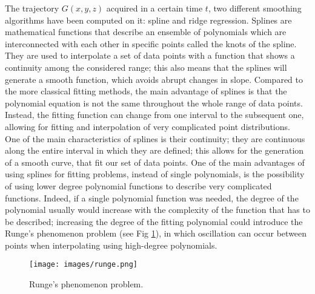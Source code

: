 
\noindent The trajectory $G(x, y, z)$ acquired in a certain time $t$, two different smoothing algorithms have been computed on it: spline and ridge regression.
Splines are mathematical functions that describe an ensemble of polynomials which are interconnected with each other in specific points called the knots of the spline. They are used to interpolate a set of data points with a function that shows a continuity among the considered range; this also means that the splines will generate a smooth function, which avoids abrupt changes in slope. Compared to the more classical fitting methods, the main advantage of splines is that the polynomial equation is not the same throughout the whole range of data points. Instead, the fitting function can change from one interval to the subsequent one, allowing for fitting and interpolation of very complicated point distributions. \\

\noindent One of the main characteristics of splines is their continuity; they are continuous along the entire interval in which they are defined; this allows for the generation of a smooth curve, that fit our set of data points. One of the main advantages of using splines for fitting problems, instead of single polynomials, is the possibility of using lower degree polynomial functions to describe very complicated functions. Indeed, if a single polynomial function was needed, the degree of the polynomial usually would increase with the complexity of the function that has to be described; increasing the degree of the fitting polynomial could introduce the Runge's phenomenon problem (see Fig \ref{fig:runge}), in which oscillation can occur between points when interpolating using high-degree polynomials. \\

\begin{figure}[H]
	\centering
	\texttt{[image: images/runge.png]}
	\caption[Runge's phenomenon problem.]{Runge's phenomenon problem.}
	\label{fig:runge}
\end{figure}


